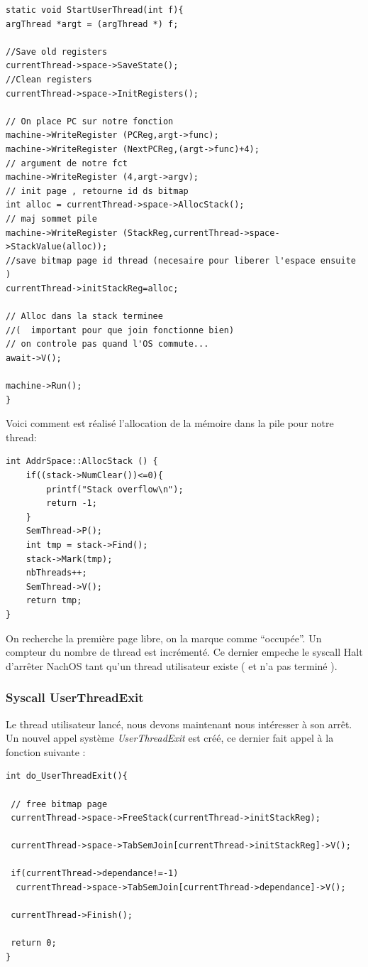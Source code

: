 \documentclass[a4paper,10pt]{article}
\begin{document}
\begin{lstlisting}[frame=single]
 static void StartUserThread(int f){
argThread *argt = (argThread *) f;

//Save old registers
currentThread->space->SaveState();
//Clean registers
currentThread->space->InitRegisters();

// On place PC sur notre fonction
machine->WriteRegister (PCReg,argt->func);
machine->WriteRegister (NextPCReg,(argt->func)+4);
// argument de notre fct
machine->WriteRegister (4,argt->argv);
// init page , retourne id ds bitmap
int alloc = currentThread->space->AllocStack();
// maj sommet pile
machine->WriteRegister (StackReg,currentThread->space->StackValue(alloc));
//save bitmap page id thread (necesaire pour liberer l'espace ensuite )
currentThread->initStackReg=alloc;

// Alloc dans la stack terminee
//(  important pour que join fonctionne bien)
// on controle pas quand l'OS commute...
await->V();

machine->Run();
}
\end{lstlisting}

Voici comment est réalisé l'allocation de la mémoire dans la pile pour notre thread:
\begin{lstlisting}[frame=single]
 int AddrSpace::AllocStack () {
	if((stack->NumClear())<=0){
		printf("Stack overflow\n");
		return -1;
	}
	SemThread->P();	
	int tmp = stack->Find();
	stack->Mark(tmp);
	nbThreads++;
	SemThread->V();
	return tmp;
}
\end{lstlisting}

On recherche la première page libre, on la marque comme ``occupée''. Un compteur du nombre de thread est incrémenté.
Ce dernier empeche le syscall Halt d'arrêter NachOS tant qu'un thread utilisateur existe ( et n'a pas terminé ).
\newpage
\subsubsection{Syscall UserThreadExit}
Le thread utilisateur lancé, nous devons maintenant nous intéresser à son arrêt.
Un nouvel appel système \textit{UserThreadExit} est créé, ce dernier fait appel à la fonction suivante :

\begin{lstlisting}[frame=single]
 int do_UserThreadExit(){

 // free bitmap page
 currentThread->space->FreeStack(currentThread->initStackReg);
 
 currentThread->space->TabSemJoin[currentThread->initStackReg]->V();
 
 if(currentThread->dependance!=-1)
  currentThread->space->TabSemJoin[currentThread->dependance]->V();
 
 currentThread->Finish();
 
 return 0;
}
\end{lstlisting}
\end{document}
